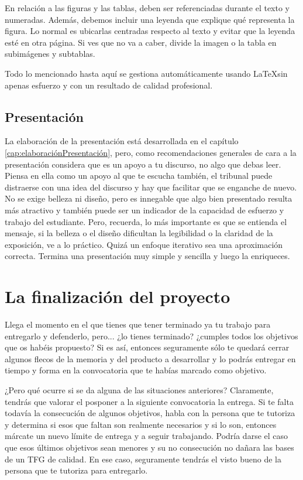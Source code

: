 En relación a las figuras y las tablas, deben ser referenciadas durante el texto y numeradas. Además, debemos incluir una leyenda que explique qué representa la figura. Lo normal es ubicarlas centradas respecto al texto y evitar que la leyenda esté en otra página. Si ves que no va a caber, divide la imagen o la tabla en subimágenes y subtablas.

Todo lo mencionado hasta aquí se gestiona automáticamente usando \LaTeX sin apenas esfuerzo y con un resultado de calidad profesional.

\subsection{Presentación}

La elaboración de la presentación está desarrollada en el capítulo \ref{cap:elaboraciónPresentación}, pero, como recomendaciones generales de cara a la presentación considera que es un apoyo a tu discurso, no algo que debas leer. Piensa en ella como un apoyo al que te escucha también, el tribunal puede distraerse con una idea del discurso y hay que facilitar que se enganche de nuevo. No se exige belleza ni diseño, pero es innegable que algo bien presentado resulta más atractivo y también puede ser un indicador de la capacidad de esfuerzo y trabajo del estudiante. Pero, recuerda, lo más importante es que se entienda el mensaje, si la belleza o el diseño dificultan la legibilidad o la claridad de la exposición, ve a lo práctico. Quizá un enfoque iterativo sea una aproximación correcta. Termina una presentación muy simple y sencilla y luego la enriqueces.

\section{La finalización del proyecto}

Llega el momento en el que tienes que tener terminado ya tu trabajo para entregarlo y defenderlo, pero... ¿lo tienes terminado? ¿cumples todos los objetivos que os habéis propuesto? Si es así, entonces seguramente sólo te quedará cerrar algunos flecos de la memoria y del producto a desarrollar y lo podrás entregar en tiempo y forma en la convocatoria que te habías marcado como objetivo.

¿Pero qué ocurre si se da alguna de las situaciones anteriores? Claramente, tendrás que valorar el posponer a la siguiente convocatoria la entrega. Si te falta todavía la consecución de algunos objetivos, habla con la persona que te tutoriza y determina si esos que faltan son realmente necesarios y si lo son, entonces márcate un nuevo límite de entrega y a seguir trabajando. Podría darse el caso que esos últimos objetivos sean menores y su no consecución no dañara las bases de un TFG de calidad. En ese caso, seguramente tendrás el visto bueno de la persona que te tutoriza para entregarlo. 

